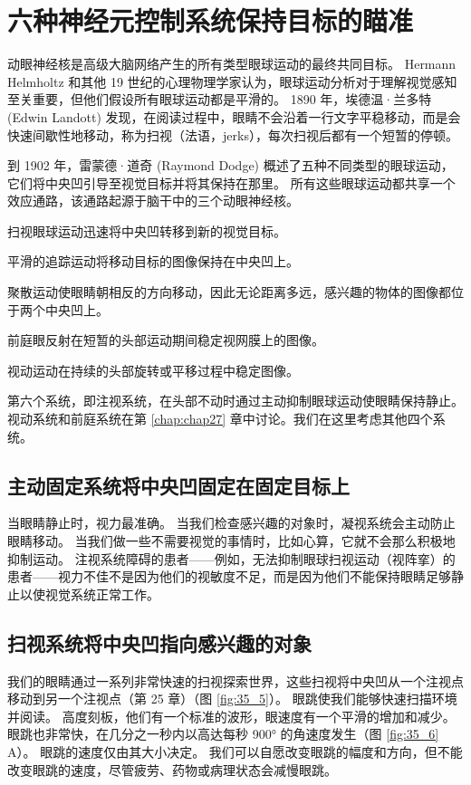 \section{六种神经元控制系统保持目标的瞄准}

动眼神经核是高级大脑网络产生的所有类型眼球运动的最终共同目标。
Hermann Helmholtz 和其他 19 世纪的心理物理学家认为，眼球运动分析对于理解视觉感知至关重要，但他们假设所有眼球运动都是平滑的。
1890 年，埃德温·兰多特 (Edwin Landott) 发现，在阅读过程中，眼睛不会沿着一行文字平稳移动，而是会快速间歇性地移动，称为扫视（法语，jerks），每次扫视后都有一个短暂的停顿。


到 1902 年，雷蒙德·道奇 (Raymond Dodge) 概述了五种不同类型的眼球运动，它们将中央凹引导至视觉目标并将其保持在那里。
所有这些眼球运动都共享一个效应通路，该通路起源于脑干中的三个动眼神经核。


扫视眼球运动迅速将中央凹转移到新的视觉目标。


平滑的追踪运动将移动目标的图像保持在中央凹上。


聚散运动使眼睛朝相反的方向移动，因此无论距离多远，感兴趣的物体的图像都位于两个中央凹上。


前庭眼反射在短暂的头部运动期间稳定视网膜上的图像。


视动运动在持续的头部旋转或平移过程中稳定图像。


第六个系统，即注视系统，在头部不动时通过主动抑制眼球运动使眼睛保持静止。
视动系统和前庭系统在第 \ref{chap:chap27} 章中讨论。我们在这里考虑其他四个系统。



\subsection{主动固定系统将中央凹固定在固定目标上}

当眼睛静止时，视力最准确。
当我们检查感兴趣的对象时，凝视系统会主动防止眼睛移动。
当我们做一些不需要视觉的事情时，比如心算，它就不会那么积极地抑制运动。
注视系统障碍的患者——例如，无法抑制眼球扫视运动（视阵挛）的患者——视力不佳不是因为他们的视敏度不足，而是因为他们不能保持眼睛足够静止以使视觉系统正常工作。



\subsection{扫视系统将中央凹指向感兴趣的对象}

我们的眼睛通过一系列非常快速的扫视探索世界，这些扫视将中央凹从一个注视点移动到另一个注视点（第 25 章）（图 \ref{fig:35_5}）。
眼跳使我们能够快速扫描环境并阅读。 
高度刻板，他们有一个标准的波形，眼速度有一个平滑的增加和减少。 
眼跳也非常快，在几分之一秒内以高达每秒 900° 的角速度发生（图 \ref{fig:35_6} A）。 
眼跳的速度仅由其大小决定。 我们可以自愿改变眼跳的幅度和方向，但不能改变眼跳的速度，尽管疲劳、药物或病理状态会减慢眼跳。


